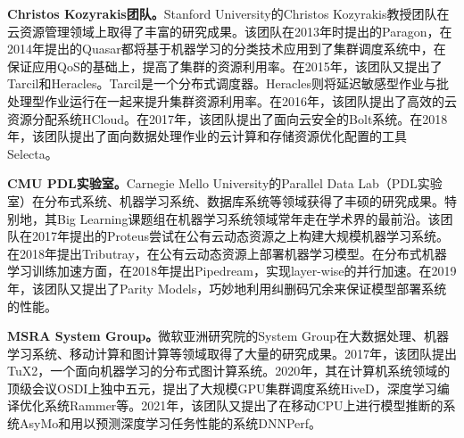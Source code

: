 \textbf{Christos Kozyrakis团队。}Stanford University的Christos Kozyrakis教授团队在云资源管理领域上取得了丰富的研究成果。该团队在2013年时提出的Paragon\parencite{delimitrou2013paragon}，在2014年提出的Quasar\parencite{delimitrou2014quasar}都将基于机器学习的分类技术应用到了集群调度系统中，在保证应用QoS的基础上，提高了集群的资源利用率。在2015年，该团队又提出了Tarcil\parencite{delimitrou2015tarcil}和Heracles\parencite{lo2015heracles}。Tarcil是一个分布式调度器。Heracles则将延迟敏感型作业与批处理型作业运行在一起来提升集群资源利用率。在2016年，该团队提出了高效的云资源分配系统HCloud\parencite{delimitrou2016hcloud}。在2017年，该团队提出了面向云安全的Bolt系统。在2018年，该团队提出了面向数据处理作业的云计算和存储资源优化配置的工具Selecta。

\textbf{CMU PDL实验室。}Carnegie Mello University的Parallel Data Lab（PDL实验室）在分布式系统、机器学习系统、数据库系统等领域获得了丰硕的研究成果。特别地，其Big Learning课题组在机器学习系统领域常年走在学术界的最前沿。该团队在2017年提出的Proteus尝试在公有云动态资源之上构建大规模机器学习系统。在2018年提出Tributray，在公有云动态资源上部署机器学习模型。在分布式机器学习训练加速方面，在2018年提出Pipedream\parencite{narayanan2019pipedream}，实现layer-wise的并行加速。在2019年，该团队又提出了Parity Models\parencite{kosaian2019parity}，巧妙地利用纠删码冗余来保证模型部署系统的性能。

\textbf{MSRA System Group。}微软亚洲研究院的System Group在大数据处理、机器学习系统、移动计算和图计算等领域取得了大量的研究成果。2017年，该团队提出TuX2\parencite{xiao2017tux}，一个面向机器学习的分布式图计算系统。2020年，其在计算机系统领域的顶级会议OSDI上独中五元，提出了大规模GPU集群调度系统HiveD，深度学习编译优化系统Rammer\parencite{ma2020rammer}等。2021年，该团队又提出了在移动CPU上进行模型推断的系统AsyMo\parencite{wang2021asymo}和用以预测深度学习任务性能的系统DNNPerf\parencite{gao2021runtime}。